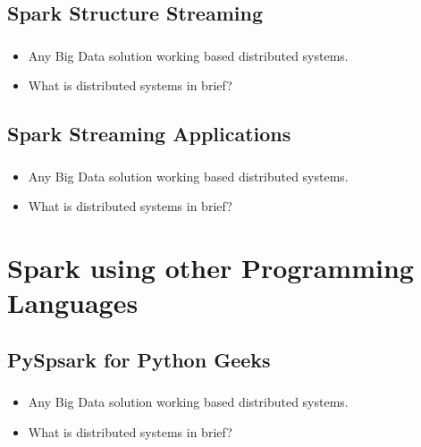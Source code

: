 

\subsection{Spark Structure Streaming}

\begin{frame}
  \frametitle{\subsecname}
	\begin{itemize}[<+->]
		\item Any Big Data solution working based distributed systems.
		\item What is distributed systems in brief?
	\end{itemize}
\end{frame}



\subsection{Spark Streaming Applications}

\begin{frame}
  \frametitle{\subsecname}
	\begin{itemize}[<+->]
		\item Any Big Data solution working based distributed systems.
		\item What is distributed systems in brief?
	\end{itemize}
\end{frame}


\section{Spark using other Programming Languages}

\subsection{PySpsark for Python Geeks}

\begin{frame}
  \frametitle{\subsecname}
	\begin{itemize}[<+->]
		\item Any Big Data solution working based distributed systems.
		\item What is distributed systems in brief?
	\end{itemize}
\end{frame}


